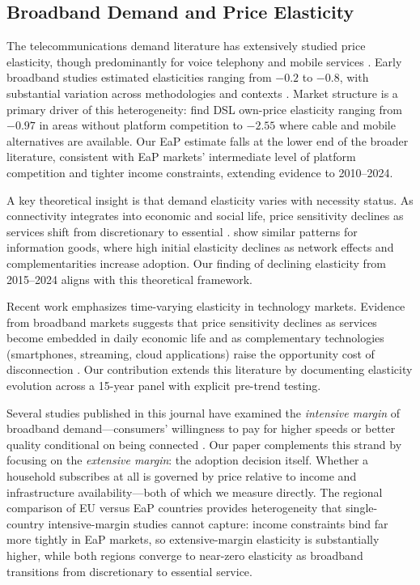 \subsection{Broadband Demand and Price Elasticity}

The telecommunications demand literature has extensively studied price elasticity, though predominantly for voice telephony and mobile services \citep{hausman2001private, madden2015demand}. Early broadband studies estimated elasticities ranging from $-0.2$ to $-0.8$, with substantial variation across methodologies and contexts \citep{rappoport2003demand, hauge2010demand}. Market structure is a primary driver of this heterogeneity: \citet{cardona2009demand} find DSL own-price elasticity ranging from $-0.97$ in areas without platform competition to $-2.55$ where cable and mobile alternatives are available. Our EaP estimate falls at the lower end of the broader literature, consistent with EaP markets' intermediate level of platform competition and tighter income constraints, extending evidence to 2010--2024.

A key theoretical insight is that demand elasticity varies with necessity status. As connectivity integrates into economic and social life, price sensitivity declines as services shift from discretionary to essential \citep{hausman2001private}. \citet{brynjolfsson2003consumer} show similar patterns for information goods, where high initial elasticity declines as network effects and complementarities increase adoption. Our finding of declining elasticity from 2015--2024 aligns with this theoretical framework.

Recent work emphasizes time-varying elasticity in technology markets. Evidence from broadband markets suggests that price sensitivity declines as services become embedded in daily economic life and as complementary technologies (smartphones, streaming, cloud applications) raise the opportunity cost of disconnection \citep{goolsbee2006spillovers}. Our contribution extends this literature by documenting elasticity evolution across a 15-year panel with explicit pre-trend testing.

Several studies published in this journal have examined the \textit{intensive margin} of broadband demand---consumers' willingness to pay for higher speeds or better quality conditional on being connected \citep{liu2018distinguishing, lindlacher2021low, sinclair2023broadband, grzybowski2014market}. Our paper complements this strand by focusing on the \textit{extensive margin}: the adoption decision itself. Whether a household subscribes at all is governed by price relative to income and infrastructure availability---both of which we measure directly. The regional comparison of EU versus EaP countries provides heterogeneity that single-country intensive-margin studies cannot capture: income constraints bind far more tightly in EaP markets, so extensive-margin elasticity is substantially higher, while both regions converge to near-zero elasticity as broadband transitions from discretionary to essential service.

